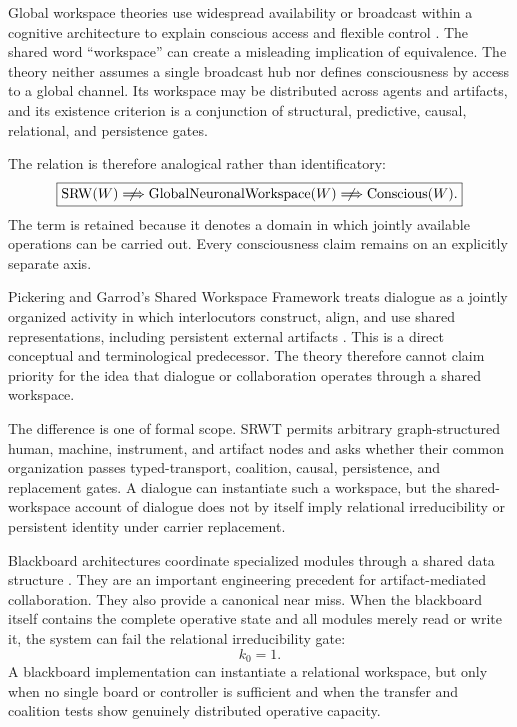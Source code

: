 

Global workspace theories use widespread availability or broadcast within a
cognitive architecture to explain conscious access and flexible control
\cite{Baars1988,DehaeneChangeux2011}. The shared word ``workspace'' can create
a misleading implication of equivalence. The theory neither assumes a
single broadcast hub nor defines consciousness by access to a global channel.
Its workspace may be distributed across agents and artifacts, and its
existence criterion is a conjunction of structural, predictive, causal,
relational, and persistence gates.

The relation is therefore analogical rather than identificatory:
\[
\boxed{
\operatorname{SRW}(W)
\centernot\Longrightarrow
\operatorname{GlobalNeuronalWorkspace}(W)
\centernot\Longrightarrow
\operatorname{Conscious}(W).
}
\]
The term is retained because it denotes a domain in which jointly
available operations can be carried out. Every consciousness claim remains on
an explicitly separate axis.


Pickering and Garrod's Shared Workspace Framework treats dialogue as a jointly
organized activity in which interlocutors construct, align, and use shared
representations, including persistent external artifacts
\cite{PickeringGarrod2021}. This is a direct conceptual and terminological
predecessor. The theory therefore cannot claim priority for the idea
that dialogue or collaboration operates through a shared workspace.

The difference is one of formal scope. SRWT permits arbitrary graph-structured
human, machine, instrument, and artifact nodes and asks whether their common
organization passes typed-transport, coalition, causal, persistence, and
replacement gates. A dialogue can instantiate such a workspace, but the
shared-workspace account of dialogue does not by itself imply relational
irreducibility or persistent identity under carrier replacement.


Blackboard architectures coordinate specialized modules through a shared data
structure \cite{HayesRoth1985}. They are an important engineering precedent
for artifact-mediated collaboration. They also provide a canonical near
miss. When the blackboard itself contains the complete operative state and
all modules merely read or write it, the system can fail the relational
irreducibility gate:
\[
k_0=1.
\]
A blackboard implementation can instantiate a relational workspace, but only
when no single board or controller is sufficient and when the transfer and
coalition tests show genuinely distributed operative capacity.

